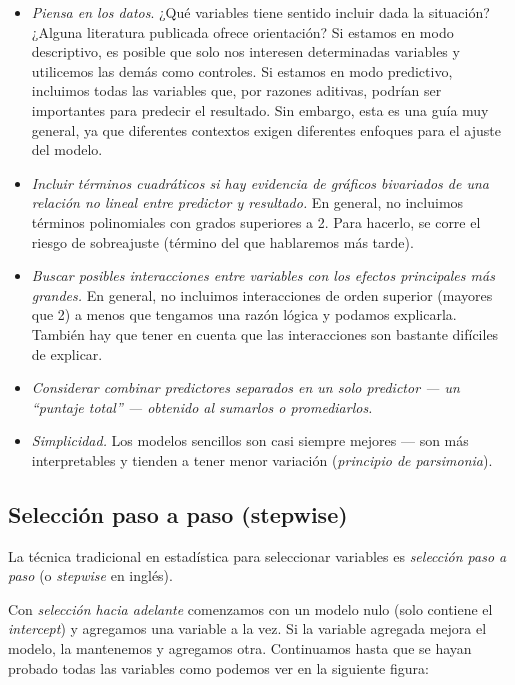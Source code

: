 \documentclass[
]{book}
\begin{document}
\begin{itemize}
\item
  \emph{Piensa en los datos}. ¿Qué variables tiene sentido incluir dada la situación? ¿Alguna literatura publicada ofrece orientación? Si estamos en modo descriptivo, es posible que solo nos interesen determinadas variables y utilicemos las demás como controles. Si estamos en modo predictivo, incluimos todas las variables que, por razones aditivas, podrían ser importantes para predecir el resultado. Sin embargo, esta es una guía muy general, ya que diferentes contextos exigen diferentes enfoques para el ajuste del modelo.
\item
  \emph{Incluir términos cuadráticos si hay evidencia de gráficos bivariados de una relación no lineal entre predictor y resultado.} En general, no incluimos términos polinomiales con grados superiores a 2. Para hacerlo, se corre el riesgo de sobreajuste (término del que hablaremos más tarde).
\item
  \emph{Buscar posibles interacciones entre variables con los efectos principales más grandes.} En general, no incluimos interacciones de orden superior (mayores que 2) a menos que tengamos una razón lógica y podamos explicarla. También hay que tener en cuenta que las interacciones son bastante difíciles de explicar.
\item
  \emph{Considerar combinar predictores separados en un solo predictor --- un ``puntaje total'' --- obtenido al sumarlos o promediarlos.}
\item
  \emph{Simplicidad.} Los modelos sencillos son casi siempre mejores --- son más interpretables y tienden a tener menor variación (\emph{principio de parsimonia}).
\end{itemize}

\hypertarget{selecciuxf3n-paso-a-paso-stepwise}{%
\subsection{Selección paso a paso (stepwise)}\label{selecciuxf3n-paso-a-paso-stepwise}}

La técnica tradicional en estadística para seleccionar variables es \emph{selección paso a paso} (o \emph{stepwise} en inglés).

Con \emph{selección hacia adelante} comenzamos con un modelo nulo (solo contiene el \emph{intercept}) y agregamos una variable a la vez. Si la variable agregada mejora el modelo, la mantenemos y agregamos otra. Continuamos hasta que se hayan probado todas las variables como podemos ver en la siguiente figura:
\end{document}
